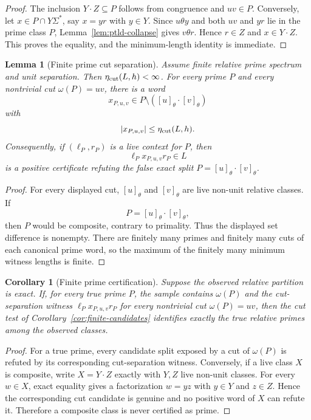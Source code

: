 \documentclass[11pt,a4paper]{article}
\newtheorem{lemma}[theorem]{Lemma}
\newtheorem{corollary}[theorem]{Corollary}
\begin{document}
\begin{proof}
The inclusion $Y\cdot Z\subseteq P$ follows from congruence and
$uv\in P$.  Conversely, let $x\in P\cap Y\Sigma^*$, say $x=yr$ with
$y\in Y$.  Since $u\theta y$ and both $uv$ and $yr$ lie in the prime
class $P$, Lemma~\ref{lem:ptld-collapse} gives $v\theta r$.  Hence
$r\in Z$ and $x\in Y\cdot Z$.  This proves the equality, and the
minimum-length identity is immediate.
\end{proof}

\begin{lemma}[Finite prime cut separation]
\label{lem:finite-cut-separation}
Assume finite relative prime spectrum and unit separation.  Then
$\eta_{\rm cut}(L,h)<\infty$.  For every prime $P$ and every nontrivial cut
$\omega(P)=uv$, there is a word
\[
  x_{P,u,v}\in
  P\setminus([u]_\theta\cdot[v]_\theta)
\]
with
\[
  |x_{P,u,v}|\le\eta_{\rm cut}(L,h).
\]
Consequently, if $(\ell_P,r_P)$ is a live context for $P$, then
\[
  \ell_Px_{P,u,v}r_P\in L
\]
is a positive certificate refuting the false exact split
$P=[u]_\theta\cdot[v]_\theta$.
\end{lemma}

\begin{proof}
For every displayed cut, $[u]_\theta$ and $[v]_\theta$ are live non-unit relative classes.  If
\[
  P=[u]_\theta\cdot[v]_\theta,
\]
then $P$ would be composite, contrary to primality.  Thus the displayed set difference is nonempty.  There are finitely many primes and finitely many cuts of each canonical prime word, so the maximum of the finitely many minimum witness lengths is finite.
\end{proof}

\begin{corollary}[Finite prime certification]
\label{cor:prime-certification}
Suppose the observed relative partition is exact.  If, for every true prime $P$, the sample contains $\omega(P)$ and the cut-separation witness $\ell_Px_{P,u,v}r_P$ for every nontrivial cut $\omega(P)=uv$, then the cut test of Corollary~\ref{cor:finite-candidates} identifies exactly the true relative primes among the observed classes.
\end{corollary}

\begin{proof}
For a true prime, every candidate split exposed by a cut of $\omega(P)$ is refuted by its corresponding cut-separation witness.  Conversely, if a live class $X$ is composite, write $X=Y\cdot Z$ exactly with $Y,Z$ live non-unit classes.  For every $w\in X$, exact equality gives a factorization $w=yz$ with $y\in Y$ and $z\in Z$.  Hence the corresponding cut candidate is genuine and no positive word of $X$ can refute it.  Therefore a composite class is never certified as prime.
\end{proof}
\end{document}
